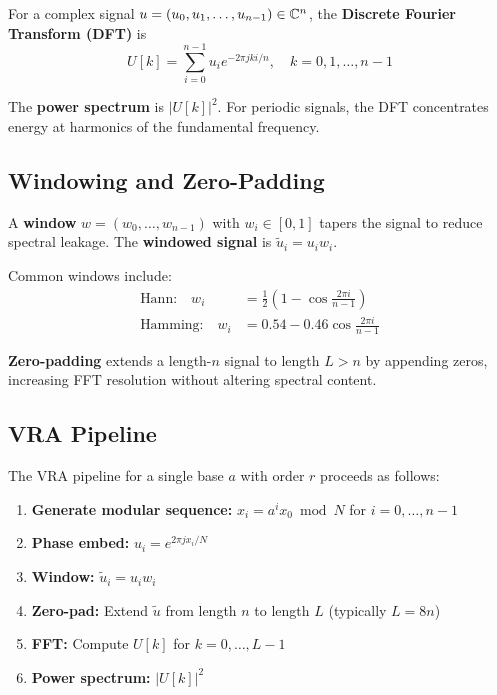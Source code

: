 \begin{definition}[DFT]
For a complex signal $u = (u_0, u_1, \ldots, u_{n-1}) \in \mathbb{C}^n$, the \textbf{Discrete Fourier Transform (DFT)} is
\begin{equation}
U[k] = \sum_{i=0}^{n-1} u_i e^{-2\pi j k i / n}, \quad k = 0, 1, \ldots, n-1
\end{equation}
\end{definition}

The \textbf{power spectrum} is $|U[k]|^2$. For periodic signals, the DFT concentrates energy at harmonics of the fundamental frequency.

\subsection{Windowing and Zero-Padding}

\begin{definition}
A \textbf{window} $w = (w_0, \ldots, w_{n-1})$ with $w_i \in [0,1]$ tapers the signal to reduce spectral leakage. The \textbf{windowed signal} is $\tilde{u}_i = u_i w_i$.
\end{definition}

Common windows include:
\begin{align}
\text{Hann:} \quad w_i &= \frac{1}{2}\left(1 - \cos\frac{2\pi i}{n-1}\right) \\
\text{Hamming:} \quad w_i &= 0.54 - 0.46\cos\frac{2\pi i}{n-1}
\end{align}

\textbf{Zero-padding} extends a length-$n$ signal to length $L > n$ by appending zeros, increasing FFT resolution without altering spectral content.

\subsection{VRA Pipeline}

The VRA pipeline for a single base $a$ with order $r$ proceeds as follows:

\begin{enumerate}
    \item \textbf{Generate modular sequence:} $x_i = a^i x_0 \bmod N$ for $i = 0, \ldots, n-1$
    \item \textbf{Phase embed:} $u_i = e^{2\pi j x_i / N}$
    \item \textbf{Window:} $\tilde{u}_i = u_i w_i$
    \item \textbf{Zero-pad:} Extend $\tilde{u}$ from length $n$ to length $L$ (typically $L = 8n$)
    \item \textbf{FFT:} Compute $U[k]$ for $k = 0, \ldots, L-1$
    \item \textbf{Power spectrum:} $|U[k]|^2$
\end{enumerate}

